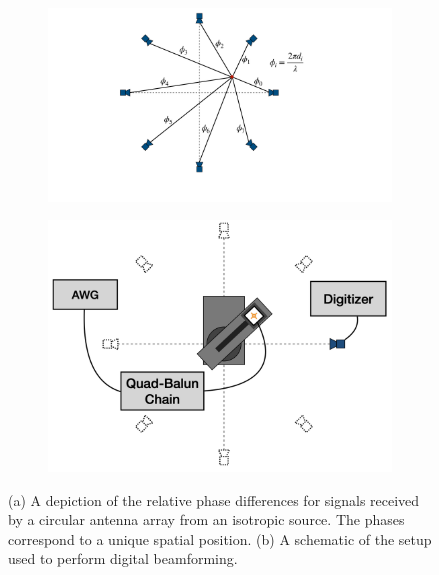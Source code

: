 \begin{figure}[b]
    \centering
    \begin{subfigure}[b]{0.45\textwidth}
        \centering
        \includegraphics[width=.85\textwidth]{figs/Chapter-5/220728_beamforming_concept.pdf}
        \caption{\label{fig:beamforming-concept}}
    \end{subfigure}
    \hfill
    \begin{subfigure}[b]{0.45\textwidth}
        \centering
        \includegraphics[width=\textwidth]{figs/Chapter-5/220815_beamforming_schematic.001.png}
        \caption{\label{fig:beamforming-measurement}}
    \end{subfigure}
    \hfill
    \caption{\label{fig:beamforming} (a) A depiction of the relative phase differences for signals received by a circular antenna array from an isotropic source. The phases correspond to a unique spatial position. (b) A schematic of the setup used to perform digital beamforming.}
    \qquad
\end{figure}

